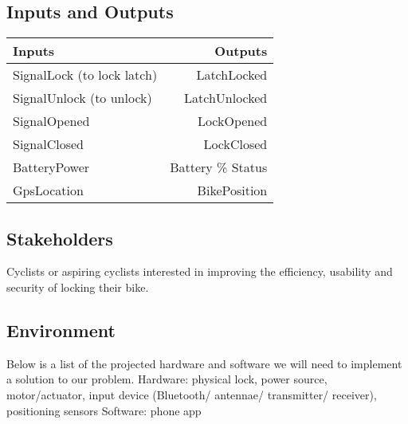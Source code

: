 \documentclass{article}
\begin{document}
\subsection{Inputs and Outputs}

\begin{table}[hI]
  \begin{center}
    \begin{tabular}{l|r}
      \textbf{Inputs} & \textbf{Outputs}\\
      \hline
      SignalLock (to lock latch)  & LatchLocked\\
	    SignalUnlock (to unlock) & LatchUnlocked\\
	    SignalOpened & LockOpened\\
	    SignalClosed & LockClosed\\
	    BatteryPower & Battery \% Status\\
	    GpsLocation & BikePosition\\
    \end{tabular}
  \end{center}
\end{table}


\subsection{Stakeholders}

Cyclists or aspiring cyclists interested in improving the efficiency, usability and security of locking their bike.

\subsection{Environment}

Below is a list of the projected hardware and software we will need to implement a solution to our problem.
Hardware: physical lock, power source, motor/actuator, input device (Bluetooth/ antennae/ transmitter/ receiver), positioning sensors 
Software: phone app

\end{document}
